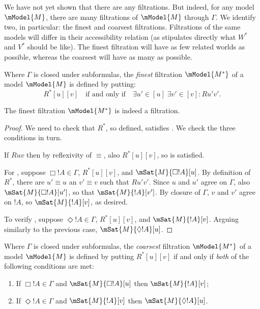 \documentclass[../../../include/open-logic-section]{subfiles}
\begin{document}


We have not yet shown that there are any filtrations. But indeed, for
any model $\mModel{M}$, there are many filtrations of $\mModel{M}$
through $\Gamma$. We identify two, in particular: the finest and
coarsest filtrations. Filtrations of the same models will differ in
their accessibility relation (as  stipulates
directly what $W^*$ and $V^*$ should be like). The finest filtration
will have as few related worlds as possible, whereas the coarsest will
have as many as possible.

\begin{defn}
  Where $\Gamma$ is closed under subformulas, the \emph{finest}
  filtration $\mModel{M^*}$ of a model $\mModel{M}$ is defined by putting:
  \[
  R^*[u][v] \quad \text{if and only if} \quad \exists u'\in [u] \;
  \exists v' \in [v] : Ru'v'.
  \]
\end{defn}

\begin{prop}
  The finest filtration $\mModel{M^*}$ is indeed a filtration. 
\end{prop}

\begin{proof}
  We need to check that $R^*$, so defined, satisfies
  . We check
  the three conditions in turn.

  If $Ruv$ then by reflexivity of $\equiv$, also $R^*[u][v]$, so
   is satisfied.
  
  For , suppose $\Box!A \in \Gamma$,
  $R^*[u][v]$, and $\mSat{M}{\Box!A}[u]$. By definition of $R^*$,
  there are $u' \equiv u$ an $v' \equiv v$ such that $Ru'v'$. Since
  $u$ and $u'$ agree on $\Gamma$, also $\mSat{M}{\Box!A}[u']$, so that
  $\mSat{M}{!A}[v']$. By closure of $\Gamma$, $v$ and $v'$ agree on
  $!A$, so $\mSat{M}{!A}[v]$, as desired.
  
  To verify , suppose $\Diamond!A \in
  \Gamma$, $R^*[u][v]$, and $\mSat{M}{!A}[v]$. Arguing similarly to
  the previous case, $\mSat{M}{\Diamond!A}[u]$.
\end{proof}

\begin{defn}
  Where $\Gamma$ is closed under subformulas, the \emph{coarsest}
  filtration $\mModel{M^*}$ of a model $\mModel{M}$ is defined by
  putting $R^*[u][v]$ if and only if \emph{both} of the following
  conditions are met:
  \begin{enumerate}
  \item If $\Box!A \in \Gamma$ and $\mSat{M}{\Box!A}[u]$ then
    $\mSat{M}{!A}[v]$;
  \item If $\Diamond!A \in \Gamma$ and $\mSat{M}{!A}[v]$ then
    $\mSat{M}{\Diamond!A}[u]$.
  \end{enumerate}
\end{defn}
\end{document}
